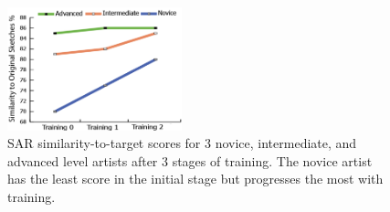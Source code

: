 









\vspace{-3mm}
\begin{figure}[ht]
\centering
\includegraphics[width = 0.45\textwidth]{images/TrainingProgress.png}
\vspace{-2mm}\caption {SAR similarity-to-target scores for 3 novice, intermediate, and advanced level artists after 3 stages of training. The novice artist has the least score in the initial stage but progresses the most with training.}
\label{TrainingProgress} \vspace{-7mm}
\end{figure}
